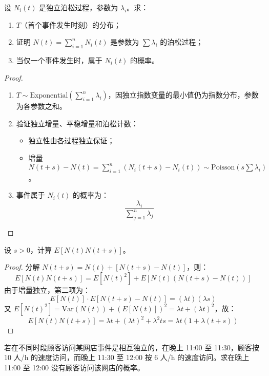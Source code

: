 \documentclass[lang=cn,10pt,thmcnt=section]{elegantbook}
\begin{document}
\begin{example}
	设 \( N_i(t) \) 是独立泊松过程，参数为 \( \lambda_i \)。求：
\begin{enumerate}
    \item \( T \)（首个事件发生时刻）的分布；
    \item 证明 \( N(t) = \sum_{i=1}^{n} N_i(t) \) 是参数为 \( \sum \lambda_i \) 的泊松过程；
    \item 当仅一个事件发生时，属于 \( N_i(t) \) 的概率。
\end{enumerate}
\end{example}
\begin{proof}
	\begin{enumerate}
		\item \( T \sim \text{Exponential}\left(\sum_{i=1}^{n} \lambda_i\right) \)，因独立指数变量的最小值仍为指数分布，参数为各参数之和。
		\item 验证独立增量、平稳增量和泊松计数：
		\begin{itemize}
			\item 独立性由各过程独立保证；
			\item 增量 \( N(t+s) - N(t) = \sum_{i=1}^{n} (N_i(t+s) - N_i(t)) \sim \text{Poisson}\left(s \sum \lambda_i\right) \)。
		\end{itemize}
		\item 事件属于 \( N_i(t) \) 的概率为：
		\[
		\frac{\lambda_i}{\sum_{j=1}^{n} \lambda_j}
		\]
	\end{enumerate}
\end{proof}
\begin{example}
	设 \( s > 0 \)，计算 \( E[N(t)N(t + s)] \)。
\end{example}
\begin{proof}
	分解 \( N(t+s) = N(t) + [N(t+s) - N(t)] \)，则：
\[
E[N(t)N(t+s)] = E[N(t)^2] + E[N(t)(N(t+s) - N(t))]
\]
由于增量独立，第二项为：
\[
E[N(t)] \cdot E[N(t+s) - N(t)] = (\lambda t)(\lambda s)
\]
又 \( E[N(t)^2] = \text{Var}(N(t)) + (E[N(t)])^2 = \lambda t + (\lambda t)^2 \)，故：
\[
E[N(t)N(t+s)] = \lambda t + (\lambda t)^2 + \lambda^2 t s = \lambda t (1 + \lambda (t + s))
\]
\end{proof}
\begin{example}
	若在不同时段顾客访问某网店事件是相互独立的，在晚上 11:00 至 11:30，顾客按 10 人/h 的速度访问，而晚上 11:30 至 12:00 按 6 人/h 的速度访问。求在晚上 11:00 至 12:00 没有顾客访问该网店的概率。
\end{example}
\end{document}
